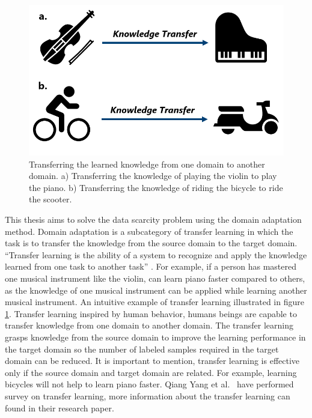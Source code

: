 \begin{figure}[H]
        \begin{center}
 	    \includegraphics[scale=0.40]{images/Introduction/TransferLearning.png}
	    \caption[Transferring the learned knowledge from one domain to another domain.]{Transferring the learned knowledge from one domain to another domain. a) Transferring the knowledge of playing the violin to play the piano. b) Transferring the knowledge of riding the bicycle to ride the scooter.}
	    \label{fig:TransferLearning}
	    \end{center}
\end{figure}

This thesis aims to solve the data scarcity problem using the domain adaptation method. Domain adaptation is a subcategory of transfer learning in which the task is to transfer the knowledge from the source domain to the target domain. ``Transfer learning is the ability of a system to recognize and apply the knowledge learned from one task to another task'' \cite{zhuang2020comprehensive}. For example, if a person has mastered one musical instrument like the violin, can learn piano faster compared to others, as the knowledge of one musical instrument can be applied while learning another musical instrument. An intuitive example of transfer learning illustrated in figure \ref{fig:TransferLearning}. Transfer learning inspired by human behavior, humans beings are capable to transfer knowledge from one domain to another domain. The transfer learning grasps knowledge from the source domain to improve the learning performance in the target domain so the number of labeled samples required in the target domain can be reduced. It is important to mention, transfer learning is effective only if the source domain and target domain are related. For example, learning bicycles will not help to learn piano faster. Qiang Yang et al.\ \cite{5288526} have performed survey on transfer learning, more information about the transfer learning can found in their research paper.  





